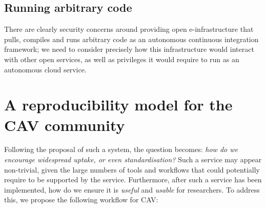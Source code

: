 \documentclass{llncs}
\begin{document}
\subsection{Running arbitrary code}

There are clearly security concerns around providing open
e-infrastructure that pulls, compiles and runs arbitrary
code as an autonomous continuous integration framework; we need to
consider precisely how this infrastructure would interact with other
open services, as well as privileges it would require to run as an
autonomous cloud service.


\section{A reproducibility model for the CAV community}\label{rollout}

Following the proposal of such a system, the question becomes:
{\emph{how do we encourage widespread uptake, or even standardisation?}}
Such a service may appear non-trivial, given the large numbers of
tools and workflows
that could potentially require to be supported by the service. Furthermore,
after such a service has been implemented, how do we ensure it is
\emph{useful} and \emph{usable} for researchers. To address this, we
propose the following workflow for CAV:
\end{document}
